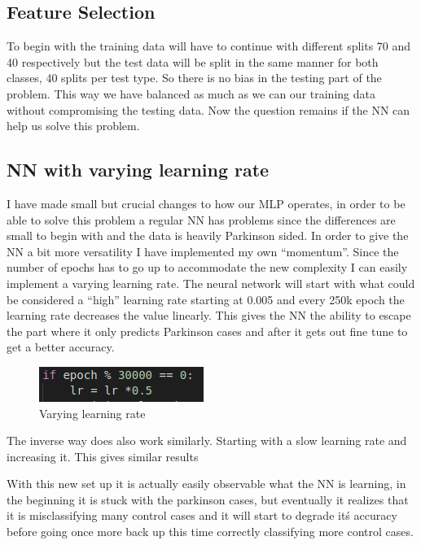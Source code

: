 \documentclass{article} %
\begin{document}
\subsection*{Feature Selection}

To begin with the training data will have to continue with different splits 70 and 40 respectively but the test data will be split in the same manner for both classes, 40 splits per test type. So there is no bias in the testing part of the problem. This way we have balanced as much as we can our training data without compromising the testing data. Now the question remains if the NN can help us solve this problem.

\subsection*{NN with varying learning rate}

I have made small but crucial changes to how our MLP operates, in order to be able to solve this problem a regular NN has problems since the differences are small to begin with and the data is heavily Parkinson sided. In order to give the NN a bit more versatility I have implemented my own “momentum”. Since the number of epochs has to go up to accommodate the new complexity I can easily implement a varying learning rate. The neural network will start with what could be considered a “high” learning rate starting at 0.005 and every 250k epoch the learning rate decreases the value linearly. This gives the NN the ability to escape the part where it only predicts Parkinson cases and after it gets out fine tune to get a better accuracy. 

\begin{figure}[h!]
  \includegraphics[scale = 1]{varlr.png}
  \centering
  \caption{Varying learning rate}\hspace*{\fill}
  \label{fig:a}
\end{figure}


The inverse way does also work similarly. Starting with a slow learning rate and increasing it. This gives similar results

With this new set up it is actually easily observable what the NN is learning, in the beginning it is stuck with the parkinson cases, but eventually it realizes that it is misclassifying many control cases and it will start to degrade itś accuracy before going once more back up this time correctly classifying more control cases.
\bigskip
\bigskip
\end{document}
